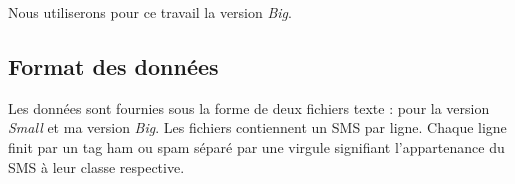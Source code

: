 Nous utiliserons pour ce travail la version \textit{Big}.

\subsection*{Format des données}

Les données sont fournies sous la forme de deux fichiers texte : pour la version \textit{Small} et ma version \textit{Big}. Les fichiers contiennent un SMS par ligne. Chaque ligne finit par un tag \og ham \fg{} ou \og spam \fg{} séparé par une virgule signifiant l'appartenance du SMS à leur classe respective.